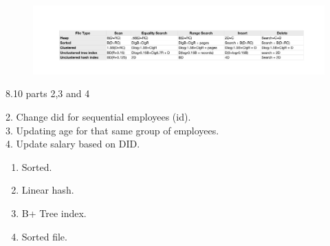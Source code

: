 \begin{problem}{8.6}
  \begin{solution}
    \begin{figure}[H]
      \centering
      \includegraphics[scale=0.65]{problem_8_6.pdf}
    \end{figure}
  \end{solution}
\end{problem}

\begin{problem}{8.10 parts 2,3 and 4}
  \begin{solution}
    2. Change did for sequential employees (id).\\
    3. Updating age for that same group of employees.\\
    4. Update salary based on DID.
  \end{solution}
\end{problem}

\begin{problem}{12.2}
  \begin{solution}
    \begin{enumerate}
      \item Sorted. \\
      \item Linear hash.\\
      \item B+ Tree index.\\
      \item Sorted file.
    \end{enumerate}
  \end{solution}
\end{problem}

\begin{problem}{12.4}
\end{problem}

\begin{problem}{12.6}
\end{problem}



